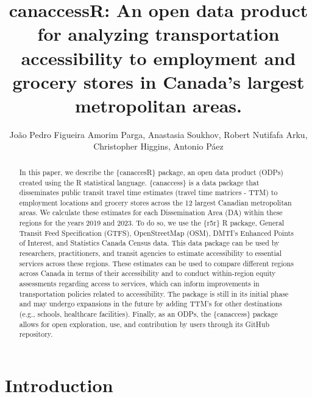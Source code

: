 \documentclass[Royal,times,sageh]{sagej}
\begin{document}

\title{canaccessR: An open data product for analyzing transportation
accessibility to employment and grocery stores in Canada's largest
metropolitan areas.}

\runninghead{}

\author{João Pedro Figueira Amorim Parga\affilnum{}, Anastasia
Soukhov\affilnum{}, Robert Nutifafa Arku\affilnum{}, Christopher
Higgins\affilnum{}, Antonio Páez\affilnum{}}

\affiliation{}



\begin{abstract}
In this paper, we describe the \{canaccesR\} package, an open data
product (ODPs) created using the R statistical language. \{canaccess\}
is a data package that disseminates public transit travel time estimates
(travel time matrices - TTM) to employment locations and grocery stores
across the 12 largest Canadian metropolitan areas. We calculate these
estimates for each Dissemination Area (DA) within these regions for the
years 2019 and 2023. To do so, we use the \{r5r\} R package, General
Transit Feed Specification (GTFS), OpenStreetMap (OSM), DMTI's Enhanced
Points of Interest, and Statistics Canada Census data. This data package
can be used by researchers, practitioners, and transit agencies to
estimate accessibility to essential services across these regions. These
estimates can be used to compare different regions across Canada in
terms of their accessibility and to conduct within-region equity
assessments regarding access to services, which can inform improvements
in transportation policies related to accessibility. The package is
still in its initial phase and may undergo expansions in the future by
adding TTM's for other destinations (e.g., schools, healthcare
facilities). Finally, as an ODPs, the \{canaccess\} package allows for
open exploration, use, and contribution by users through its GitHub
repository.
\end{abstract}


\maketitle

\section{Introduction}\label{introduction}
\end{document}
